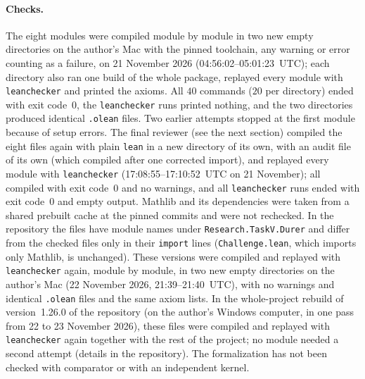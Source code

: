 \documentclass[11pt]{article}
\theoremstyle{definition}
\theoremstyle{remark}
\newcommand{\repoversion}{1.26.0}
\begin{document}
\paragraph{Checks.} The eight modules were compiled module by module in two
new empty directories on the author's Mac with the pinned toolchain, any
warning or error counting as a failure, on 21 November 2026
(04:56:02--05:01:23~UTC); each directory also ran one build of the whole
package, replayed every module with \texttt{leanchecker} and printed the
axioms. All $40$ commands ($20$ per directory) ended with exit code~$0$, the
\texttt{leanchecker} runs printed nothing, and the two directories produced
identical \texttt{.olean} files. Two earlier attempts stopped at the first
module because of setup errors. The final reviewer (see the
next section) compiled the eight files again with plain \texttt{lean} in a new
directory of its own, with an audit file of its own (which compiled after one
corrected import), and replayed every module
with \texttt{leanchecker} (17:08:55--17:10:52~UTC on 21 November); all
compiled with exit code~$0$ and no warnings, and all \texttt{leanchecker} runs
ended with exit code~$0$ and empty output. Mathlib and its dependencies were
taken from a shared prebuilt cache at the pinned commits and were not
rechecked. In the repository the files have module names under
\texttt{Research.TaskV.Durer} and differ from the checked files only in their
\texttt{import} lines (\texttt{Challenge.lean}, which imports only Mathlib, is
unchanged). These versions were compiled and replayed with \texttt{leanchecker} again, module by module, in two new empty directories on the author's Mac (22 November 2026, 21:39--21:40~UTC), with no warnings and identical \texttt{.olean} files and the same axiom lists.
In the whole-project rebuild of version~\repoversion{} of the repository (on the author's Windows computer, in one pass from 22 to 23 November 2026), these files were compiled and replayed with \texttt{leanchecker} again together with the rest of the project; no module needed a second attempt (details in the repository). The formalization has not been checked with comparator or with
an independent kernel.
\end{document}
